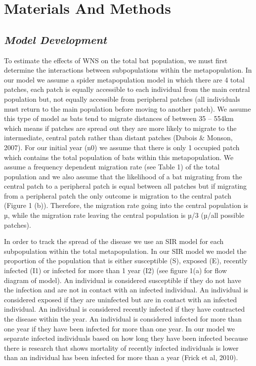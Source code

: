 \documentclass[12pt]{article}
\begin{document}
\section*{\centering \sc \large Materials And Methods}

\subsection*{\sc \textit{Model Development}}

To estimate the effects of WNS on the total bat population, we must first determine the interactions between subpopulations within the metapopulation. In our model we assume a spider metapopulation model in which there are 4 total patches, each patch is equally accessible to each individual from the main central population but, not equally accessible from peripheral patches (all individuals must return to the main population before moving to another patch). We assume this type of model as bats tend to migrate distances of between 35 – 554km which means if patches are spread out they are more likely to migrate to the intermediate, central patch rather than distant patches (Dubois & Monson, 2007). For our initial year (n0) we assume that there is only 1 occupied patch which contains the total population of bats within this metapopulation. We assume a frequency dependent migration rate (see Table 1) of the total population and we also assume that the likelihood of a bat migrating from the central patch to a peripheral patch is equal between all patches but if migrating from a peripheral patch the only outcome is migration to the central patch (Figure 1 (b)). Therefore, the migration rate going into the central population is µ, while the migration rate leaving the central population is µ/3 (µ/all possible patches).

In order to track the spread of the disease we use an SIR model for each subpopulation within the total metapopulation. In our SIR model we model the proportion of the population that is either susceptible (S), exposed (E), recently infected (I1) or infected for more than 1 year (I2) (see figure 1(a) for flow diagram of model). An individual is considered susceptible if they do not have the infection and are not in contact with an infected individual. An individual is considered exposed if they are uninfected but are in contact with an infected individual. An individual is considered recently infected if they have contracted the disease within the year. An individual is considered infected for more than one year if they have been infected for more than one year. In our model we separate infected individuals based on how long they have been infected because there is research that shows mortality of recently infected individuals is lower than an individual has been infected for more than a year (Frick et al, 2010).
\end{document}
